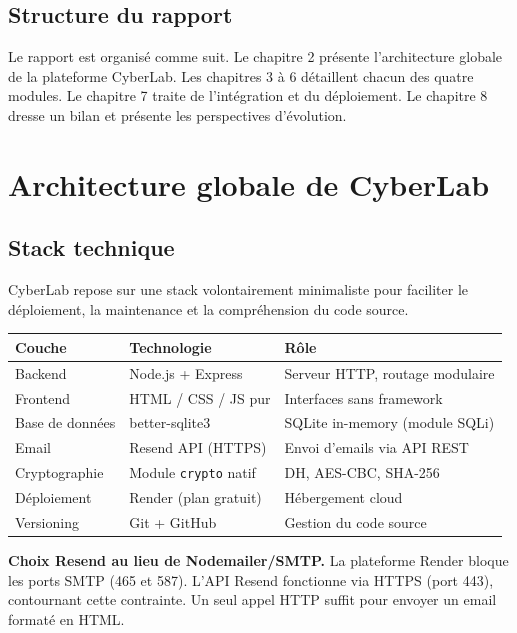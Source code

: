 \documentclass[12pt,a4paper]{report}
\newcommand{\code}[1]{\texttt{#1}}
\begin{document}
\section{Structure du rapport}

Le rapport est organisé comme suit. Le chapitre 2 présente l'architecture
globale de la plateforme CyberLab. Les chapitres 3 à 6 détaillent chacun
des quatre modules. Le chapitre 7 traite de l'intégration et du déploiement.
Le chapitre 8 dresse un bilan et présente les perspectives d'évolution.

\chapter{Architecture globale de CyberLab}

\section{Stack technique}

CyberLab repose sur une stack volontairement minimaliste pour faciliter
le déploiement, la maintenance et la compréhension du code source.

\begin{center}
\begin{tabular}{L{3.5cm} L{3.5cm} L{6cm}}
  \toprule
  \textbf{Couche} & \textbf{Technologie} & \textbf{Rôle} \\
  \midrule
  Backend         & Node.js + Express    & Serveur HTTP, routage modulaire \\
  Frontend        & HTML / CSS / JS pur  & Interfaces sans framework \\
  Base de données & better-sqlite3       & SQLite in-memory (module SQLi) \\
  Email           & Resend API (HTTPS)   & Envoi d'emails via API REST \\
  Cryptographie   & Module \code{crypto} natif & DH, AES-CBC, SHA-256 \\
  Déploiement     & Render (plan gratuit) & Hébergement cloud \\
  Versioning      & Git + GitHub         & Gestion du code source \\
  \bottomrule
\end{tabular}
\end{center}

\begin{notebox}
  \textbf{Choix Resend au lieu de Nodemailer/SMTP.}
  La plateforme Render bloque les ports SMTP (465 et 587). L'API Resend
  fonctionne via HTTPS (port 443), contournant cette contrainte.
  Un seul appel HTTP suffit pour envoyer un email formaté en HTML.
\end{notebox}
\end{document}
